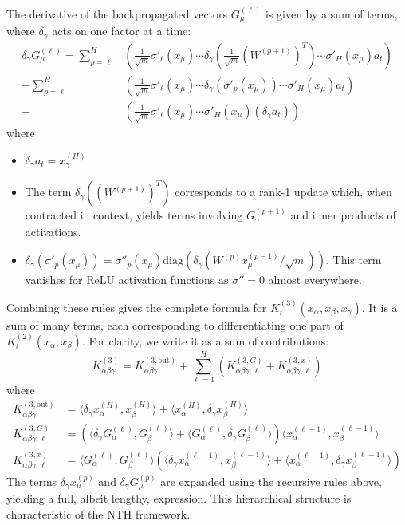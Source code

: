 \documentclass[11pt,a4paper]{article}
\theoremstyle{definition}
\begin{document}
The derivative of the backpropagated vectors $G^{(\ell)}_\mu$ is given by a sum of terms, where $\delta_\gamma$ acts on one factor at a time:
\begin{align}
\delta_\gamma G^{(\ell)}_\mu = \sum_{p=\ell}^{H} & \left( \frac{1}{\sqrt{m}}\sigma'_\ell(x_\mu) \cdots \delta_\gamma(\frac{1}{\sqrt{m}}(W^{(p+1)})^T) \cdots \sigma'_H(x_\mu) a_t \right) \\
+ \sum_{p=\ell}^{H} & \left( \frac{1}{\sqrt{m}}\sigma'_\ell(x_\mu) \cdots \delta_\gamma(\sigma'_{p}(x_\mu)) \cdots \sigma'_H(x_\mu) a_t \right) \\
+ & \left( \frac{1}{\sqrt{m}}\sigma'_\ell(x_\mu) \cdots \sigma'_H(x_\mu) (\delta_\gamma a_t) \right)
\end{align}
where
\begin{itemize}
    \item $\delta_\gamma a_t = x^{(H)}_\gamma$
    \item The term $\delta_\gamma((W^{(p+1)})^T)$ corresponds to a rank-1 update which, when contracted in context, yields terms involving $G^{(p+1)}_\gamma$ and inner products of activations.
    \item $\delta_\gamma(\sigma'_{p}(x_\mu)) = \sigma''_{p}(x_\mu) \text{diag}(\delta_\gamma(W^{(p)}x^{(p-1)}_\mu/\sqrt{m}))$. This term vanishes for ReLU activation functions as $\sigma''=0$ almost everywhere.
\end{itemize}

Combining these rules gives the complete formula for $K^{(3)}_t(x_\alpha, x_\beta, x_\gamma)$. It is a sum of many terms, each corresponding to differentiating one part of $K^{(2)}_t(x_\alpha, x_\beta)$. For clarity, we write it as a sum of contributions:
\begin{equation}
K^{(3)}_{\alpha\beta\gamma} = K^{(3, \text{out})}_{\alpha\beta\gamma} + \sum_{\ell=1}^H \left( K^{(3, G)}_{\alpha\beta\gamma, \ell} + K^{(3, x)}_{\alpha\beta\gamma, \ell} \right)
\end{equation}
where
\begin{align}
K^{(3, \text{out})}_{\alpha\beta\gamma} &= \langle \delta_\gamma x^{(H)}_\alpha, x^{(H)}_\beta \rangle + \langle x^{(H)}_\alpha, \delta_\gamma x^{(H)}_\beta \rangle \\
K^{(3, G)}_{\alpha\beta\gamma, \ell} &= \left( \langle \delta_\gamma G^{(\ell)}_\alpha, G^{(\ell)}_\beta \rangle + \langle G^{(\ell)}_\alpha, \delta_\gamma G^{(\ell)}_\beta \rangle \right) \langle x^{(\ell-1)}_\alpha, x^{(\ell-1)}_\beta \rangle \\
K^{(3, x)}_{\alpha\beta\gamma, \ell} &= \langle G^{(\ell)}_\alpha, G^{(\ell)}_\beta \rangle \left( \langle \delta_\gamma x^{(\ell-1)}_\alpha, x^{(\ell-1)}_\beta \rangle + \langle x^{(\ell-1)}_\alpha, \delta_\gamma x^{(\ell-1)}_\beta \rangle \right)
\end{align}
The terms $\delta_\gamma x^{(p)}_\mu$ and $\delta_\gamma G^{(p)}_\mu$ are expanded using the recursive rules above, yielding a full, albeit lengthy, expression. This hierarchical structure is characteristic of the NTH framework.
\end{document}
